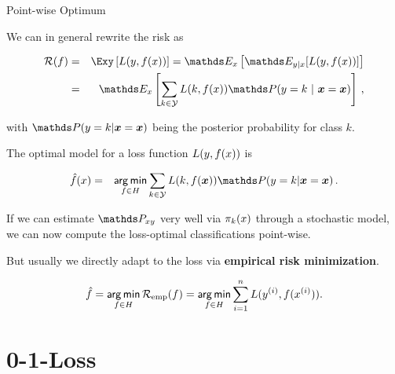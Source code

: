 \begin{vbframe}{Point-wise Optimum}


We can in general rewrite the risk as

\vspace*{-0.5cm}

\begin{eqnarray*}
  \riskf  & = & \Exy\left[\Lxy\right] = \E_x \left[ \E_{y|x} [ L(y, \fx) ] \right] \\
          & = & \E_x \left[\sum_{k \in \Yspace} L(k, \fx) \P(y = k~|~ \xv = \xv)\right]\,, \\
\end{eqnarray*}

with $\P(y = k| \xv = \xv)$ being the posterior probability for class $k$.

\lz 

The optimal model for a loss function $L(y, f(x))$ is

\begin{eqnarray*}
  \fxh &=& \argmin_{f \in \Hspace} \sum_{k \in \Yspace} L(k, f(\bm{x})) \P(y = k| \xv = \xv)\,.  \\
\end{eqnarray*}

If we can estimate $\Pxy$ very well via $\pi_k(x)$ through a stochastic model, we can now compute the loss-optimal classifications point-wise. 

But usually we directly adapt to the loss via \textbf{empirical risk minimization}. 

$$
\hat{f} = \mathop{\sf arg\,min}_{f \in H} \mathcal{R}_{\text{emp}}(f) = \mathop{\sf arg\,min}_{f \in H} \sum_{i=1}^n L(y^{(i)}, f(x^{(i)})).
$$
  

\end{vbframe}


\section{0-1-Loss}

